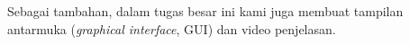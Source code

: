     Sebagai tambahan, dalam tugas besar ini kami juga membuat tampilan antarmuka (\textit{graphical interface}, GUI) dan video penjelasan. 



\pagebreak